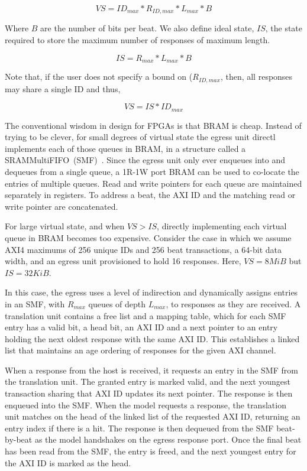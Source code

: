 $$VS = ID_{max}*R_{ID,max}*L_{max}*B$$

Where $B$ are the number of bits per beat. We also define ideal state, $IS$,
the state required to store the maximum number of responses of maximum length.

$$IS = R_{max}*L_{max}*B$$

Note that, if the user does not specify a bound on ($R_{ID,max}$, then, all
responses may share a single ID and thus,

$$VS = IS*ID_{max}$$

The conventional wisdom in design for FPGAs is that BRAM is cheap. Instead of
trying to be clever, for small degrees of virtual state the egress unit
directl implements each of those queues in BRAM, in a structure called a
SRAMMultiFIFO~(SMF)~\cite{LIFPGADesign}. Since the egress unit only ever enqueues into
and dequeues from a single queue, a 1R-1W port BRAM can be used to
co-locate the entries of multiple queues.  Read and write pointers for each
queue are maintained separately in registers. To address a beat, the AXI ID and
the matching read or write pointer are concatenated.

For large virtual state, and when $VS > IS$, directly implementing each virtual
queue in BRAM becomes too expensive. Consider the case in which we assume AXI4
 maximums of 256 unique IDs and 256 beat transactions, a 64-bit data width, and an egress unit provisioned to hold 16 responses. Here, $VS =
8MiB$ but $IS = 32 KiB$.

In this case, the egress uses a level of indirection and dynamically assigns
entries in an SMF, with $R_{max}$ queues of depth $L_{max}$, to responses as
they are received. A translation unit contains a free list and a mapping table,
which for each SMF entry has a valid bit, a head bit, an AXI ID and a next
pointer to an entry holding the next oldest response with the same AXI ID. This
establishes a linked list that maintains an age ordering of responses for the
given AXI channel.

When a response from the host is received, it requests an entry in the SMF from
the translation unit. The granted entry is marked valid, and the next youngest
transaction sharing that AXI ID updates its next pointer.  The response is then
enqueued into the SMF. When the model requests a response, the translation unit
matches on the head of the linked list of the requested AXI ID, returning an
entry index if there is a hit. The response is then dequeued from the SMF
beat-by-beat as the model handshakes on the egress response port.  Once the
final beat has been read from the SMF, the entry is freed, and the next
youngest entry for the AXI ID is marked as the head.

